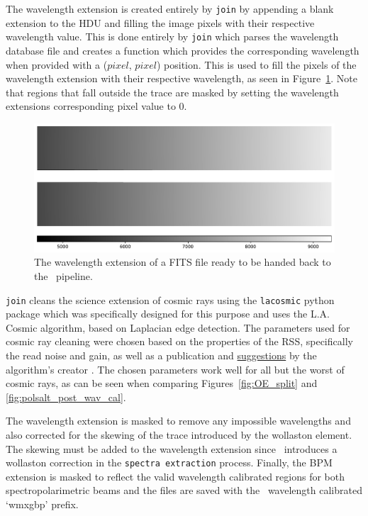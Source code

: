 The wavelength extension is created entirely by \texttt{join} by appending a blank extension to the \gls{HDU} and filling the image pixels with their respective wavelength value. This is done entirely by \texttt{join} which parses the wavelength database file and creates a function which provides the corresponding wavelength when provided with a ($pixel$, $pixel$) position. This is used to fill the pixels of the wavelength extension with their respective wavelength, as seen in Figure~\ref{fig:pol_wav_ext}. Note that regions that fall outside the trace are masked by setting the wavelength extensions corresponding pixel value to $0$.

\begin{figure}[t]
    \centering
    \includegraphics[width = 1.0\textwidth]{figures/3_pol_wav_ext.pdf}
    \caption{The wavelength extension of a \gls{FITS} file ready to be handed back to the \polsalt\ pipeline.}
    \label{fig:pol_wav_ext}
\end{figure}

\texttt{join} cleans the science extension of cosmic rays using the \texttt{lacosmic} python package which was specifically designed for this purpose and uses the L.A. Cosmic algorithm, based on Laplacian edge detection. The parameters used for cosmic ray cleaning were chosen based on the properties of the \gls{RSS}, specifically the read noise and gain, as well as a publication and \hyperlink{http://www.astro.yale.edu/dokkum/lacosmic/pars.html}{suggestions} by the algorithm's creator \citep{lacosmic}. The chosen parameters work well for all but the worst of cosmic rays, as can be seen when comparing Figures~\ref{fig:OE_split} and \ref{fig:polsalt_post_wav_cal}.

The wavelength extension is masked to remove any impossible wavelengths and also corrected for the skewing of the trace introduced by the wollaston element. The skewing must be added to the wavelength extension since \polsalt\ introduces a wollaston correction in the \texttt{spectra extraction} process. Finally, the \gls{BPM} extension is masked to reflect the valid wavelength calibrated regions for both spectropolarimetric beams and the files are saved with the \polsalt\ wavelength calibrated `wmxgbp' prefix.

